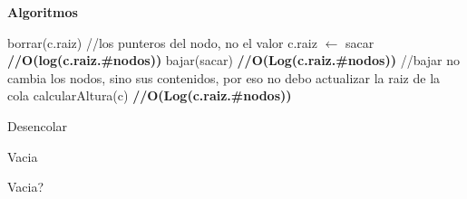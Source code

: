 \documentclass[a4paper,10pt]{article}
\newenvironment{Algoritmos}{%
  \vspace*{2ex}%
  \noindent\textbf{\Large Algoritmos}%
  \vspace*{2ex}%
}{}
\begin{document}
\begin{Algoritmos}
\begin{algorithm}[H]
{    borrar(c.raiz) \hfill //los punteros del nodo, no el valor
    \newline c.raiz $\leftarrow$ sacar \hfill \textbf{//O(log(c.raiz.\#nodos))}
	\newline bajar(sacar) \hfill \textbf{//O(Log(c.raiz.\#nodos))}
    \newline \hfill //bajar no cambia los nodos, sino sus contenidos, por eso no debo actualizar la raiz de la cola
    \newline calcularAltura(c) \hfill \textbf{//O(Log(c.raiz.\#nodos))}
    }
    \caption{Desencolar}
    \end{algorithm} 
    
    \newline
    \begin{algorithm}[H]
    \caption{Vacia}
    \end{algorithm}
   
    \newline
    \begin{algorithm}[H]
    \caption{Vacia?}
   \end{algorithm}
   
   
   
        
    

\end{Algoritmos}
\end{document}
